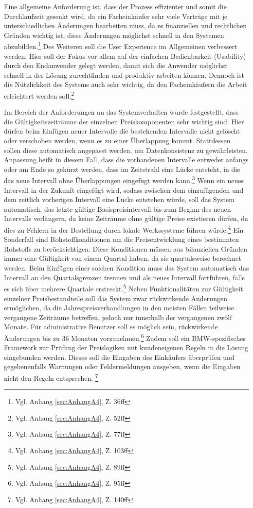 Eine allgemeine Anforderung ist, dass der Prozess effizienter und somit die Durchlaufzeit gesenkt wird, da ein Facheinkäufer sehr viele Verträge mit je unterschiedlichen Änderungen bearbeiten muss, da es finanziellen und rechtlichen Gründen wichtig ist, diese Änderungen möglichst schnell in den Systemen abzubilden.\footnote{Vgl. Anhang \ref{sec:AnhangA4}, Z. 36ff} Des Weiteren soll die User Experience im Allgemeinen verbessert werden. Hier soll der Fokus vor allem auf der einfachen Bedienbarkeit (Usability) durch den Endanwender gelegt werden, damit sich die Anwender möglichst schnell in der Lösung zurechtfinden und produktiv arbeiten können. Dennoch ist die Nützlichkeit des Systems auch sehr wichtig, da den Facheinkäufern die Arbeit erleichtert werden soll.\footnote{Vgl. Anhang \ref{sec:AnhangA4}, Z. 52ff}

Im Bereich der Anforderungen an das Systemverhalten wurde festgestellt, dass die Gültigkeitszeiträume der einzelnen Preiskomponenten sehr wichtig sind. Hier dürfen beim Einfügen neuer Intervalle die bestehenden Intervalle nicht gelöscht oder verschoben werden, wenn es zu einer Überlappung kommt. Stattdessen sollen diese automatisch angepasst werden, um Datenkonsistenz zu gewährleisten. Anpassung hei\ss t in diesem Fall, dass die vorhandenen Intervalle entweder anfangs oder am Ende so gekürzt werden, dass im Zeitstrahl eine Lücke entsteht, in die das neue Intervall ohne Überlappungen eingefügt werden kann.\footnote{Vgl. Anhang \ref{sec:AnhangA4}, Z. 77ff} Wenn ein neues Intervall in der Zukunft eingefügt wird, sodass zwischen dem einzufügenden und dem zeitlich vorherigen Intervall eine Lücke entstehen würde, soll das System automatisch, das letzte gültige Basispreisintervall bis zum Beginn des neuen Intervalls verlängern, da keine Zeiträume ohne gültige Preise existieren dürfen, da dies zu Fehlern in der Bestellung durch lokale Werkssysteme führen würde.\footnote{Vgl. Anhang \ref{sec:AnhangA4}, Z. 103ff} Ein Sonderfall sind Rohstoffkonditionen um die Preisentwicklung eines bestimmten Rohstoffs zu berücksichtigen. Diese Konditionen müssen aus bilanziellen Gründen immer eine Gültigkeit von einem Quartal haben, da sie quartalsweise berechnet werden. Beim Einfügen einer solchen Kondition muss das System automatisch das Intervall an den Quartalsgrenzen trennen und als neues Intervall fortführen, falls es sich über mehrere Quartale erstreckt.\footnote {Vgl. Anhang \ref{sec:AnhangA4}, Z. 89ff} Neben Funktionalitäten zur Gültigkeit einzelner Preisbestandteile soll das System zwar rückwirkende Änderungen ermöglichen, da die Jahrespreisverhandlungen in den meisten Fällen teilweise vergangene Zeiträume betreffen, jedoch nur innerhalb der vergangenen zwölf Monate. Für administrative Benutzer soll es möglich sein, rückwirkende Änderungen bis zu 36 Monaten vorzunehmen.\footnote{Vgl. Anhang \ref{sec:AnhangA4}, Z. 95ff} Zudem soll ein BMW-spezifisches Framework zur Prüfung der Preislogiken mit kundeneigenen Regeln in die Lösung eingebunden werden. Dieses soll die Eingaben des Einkäufers überprüfen und gegebenenfalls Warnungen oder Fehlermeldungen ausgeben, wenn die Eingaben nicht den Regeln entsprechen. \footnote{Vgl. Anhang \ref{sec:AnhangA4}, Z. 140ff}


